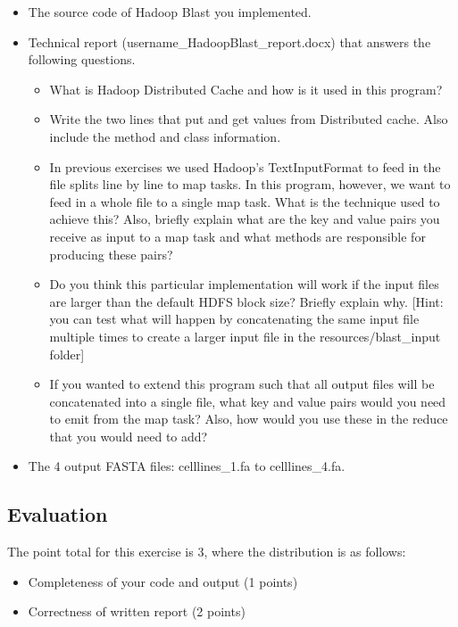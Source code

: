 \begin{itemize} 
\item The source code of Hadoop Blast you implemented.
\item	Technical report (username\_HadoopBlast\_report.docx) that answers the
  following questions.

\begin{itemize}
\item What is Hadoop Distributed Cache and how is it used in this program? 
\item Write the two lines that put and get values from Distributed cache. Also
  include the method and class information.

\item In previous exercises we used Hadoop's TextInputFormat to feed in the file
  splits line by line to map tasks. In this program, however, we want to feed
    in a whole file to a single map task. What is the technique used to achieve
    this? Also, briefly explain what are the key and value pairs you receive as
    input to a map task and what methods are responsible for producing these
    pairs?

\item Do you think this particular implementation will work if the input files
  are larger than the default HDFS block size? Briefly explain why. [Hint: you
    can test what will happen by concatenating the same input file multiple
    times to create a larger input file in the resources/blast\_input folder]

\item	If you wanted to extend this program such that all output files will be
  concatenated into a single file, what key and value pairs would you need to
    emit from the map task? Also, how would you use these in the reduce that
    you would need to add?

\end{itemize}
\item	The 4 output FASTA files: celllines\_1.fa to celllines\_4.fa.
\end{itemize}


\subsection*{Evaluation} 

The point total for this exercise is 3, where the distribution is as follows:
\begin{itemize} 
\item	Completeness of your code and output (1 points)
\item	Correctness of written report (2 points)
\end{itemize}

